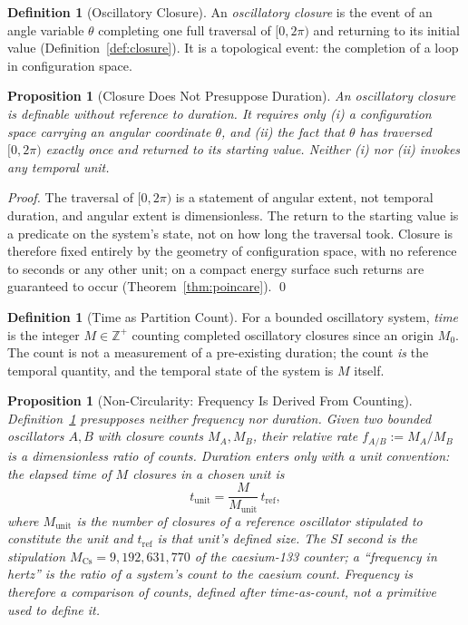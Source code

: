 \documentclass[twocolumn,10pt,a4paper]{article}
\theoremstyle{thmstyle}
\newtheorem{proposition}[theorem]{Proposition}
\theoremstyle{definition}
\newtheorem{definition}[theorem]{Definition}
\theoremstyle{remark}
\newcommand{\Zp}{\mathbb{Z}^{+}}
\begin{document}
\begin{definition}[Oscillatory Closure]
\label{def:closure-event}
An \emph{oscillatory closure} is the event of an angle variable $\theta$
completing one full traversal of $[0,2\pi)$ and returning to its initial value
(Definition~\ref{def:closure}). It is a topological event: the completion of a
loop in configuration space.
\end{definition}

\begin{proposition}[Closure Does Not Presuppose Duration]
\label{prop:closure-topological}
An oscillatory closure is definable without reference to duration. It requires
only (i) a configuration space carrying an angular coordinate $\theta$, and
(ii) the fact that $\theta$ has traversed $[0,2\pi)$ exactly once and returned
to its starting value. Neither (i) nor (ii) invokes any temporal unit.
\end{proposition}

\begin{proof}
The traversal of $[0,2\pi)$ is a statement of angular extent, not temporal
duration, and angular extent is dimensionless. The return to the starting value
is a predicate on the system's state, not on how long the traversal took.
Closure is therefore fixed entirely by the geometry of configuration space,
with no reference to seconds or any other unit; on a compact energy surface
such returns are guaranteed to occur (Theorem~\ref{thm:poincare}). \qed
\end{proof}

\begin{definition}[Time as Partition Count]
\label{def:time-as-count}
For a bounded oscillatory system, \emph{time} is the integer $M \in \Zp$
counting completed oscillatory closures since an origin $M_0$. The count is not
a measurement of a pre-existing duration; the count \emph{is} the temporal
quantity, and the temporal state of the system is $M$ itself.
\end{definition}

\begin{proposition}[Non-Circularity: Frequency Is Derived From Counting]
\label{prop:noncircular}
Definition~\ref{def:time-as-count} presupposes neither frequency nor duration.
Given two bounded oscillators $A,B$ with closure counts $M_A,M_B$, their
\emph{relative rate} $f_{A/B} := M_A / M_B$ is a dimensionless ratio of counts.
Duration enters only with a unit convention: the elapsed time of $M$ closures
in a chosen unit is
\begin{equation}
    t_{\mathrm{unit}} = \frac{M}{M_{\mathrm{unit}}}\, t_{\mathrm{ref}},
    \label{eq:t-unit}
\end{equation}
where $M_{\mathrm{unit}}$ is the number of closures of a reference oscillator
stipulated to constitute the unit and $t_{\mathrm{ref}}$ is that unit's defined
size. The SI second is the stipulation $M_{\mathrm{Cs}} = 9{,}192{,}631{,}770$
of the caesium-133 counter; a ``frequency in hertz'' is the ratio of a system's
count to the caesium count. Frequency is therefore a comparison of counts,
\emph{defined after} time-as-count, not a primitive used to define it.
\end{proposition}
\end{document}
